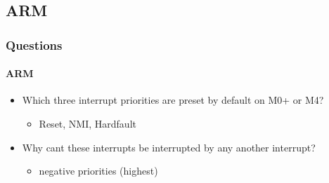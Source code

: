 \subsection*{ARM}
\begin{frame}
    \frametitle{Questions}
    \framesubtitle{ARM}
    \begin{itemize}
        \item Which three interrupt priorities are preset by default on M0+ or M4?
        \begin{itemize}
        	\item Reset, NMI, Hardfault
        \end{itemize}
        \item Why cant these interrupts be interrupted by any another interrupt?
        \begin{itemize}
        	\item negative priorities (highest)
        \end{itemize}
    \end{itemize}
\end{frame}
